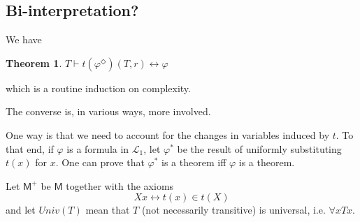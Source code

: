 \documentclass{article}
\newtheorem{Theorem}{Theorem}[section]
\theoremstyle{definition}
\begin{document}
\subsection{Bi-interpretation?}
We have
\begin{Theorem}
    $T \vdash t(\varphi^\Diamond)(T, r) \leftrightarrow \varphi$
\end{Theorem}
which is a routine induction on complexity.

The converse is, in various ways, more involved. 

One way is that we need to account for the changes in variables induced by $t$. 
To that end, if $\varphi$ is a formula in $\mathcal{L}_1$, let 
$\varphi^*$ be the result of uniformly substituting $t(x)$ for $x$. 
One can prove that $\varphi^*$ is a theorem iff $\varphi$ is a theorem. 

Let $\mathsf{M}^+$ be $\mathsf{M}$ together with the axioms 
\begin{equation}
    Xx \leftrightarrow t(x) \in t(X)
\end{equation}
and let $Univ(T)$ mean that $T$ (not necessarily transitive) is universal, 
i.e. $\forall x Tx$. 
\end{document}

